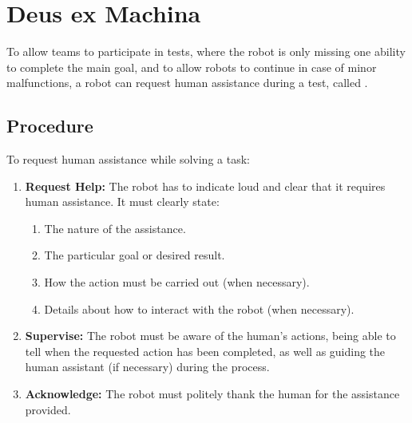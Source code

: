 \section{Deus ex Machina}
\label{sec:rules:deusexmachina}
To allow teams to participate in tests, where the robot is only missing one ability to complete the main goal, and to allow robots to continue in case of minor malfunctions, a robot can request human assistance during a test, called \DEM{}. 

\subsection{Procedure}
\label{sec:rules:demprocedure}
To request human assistance while solving a task:

\begin{enumerate}
	\item \textbf{Request Help:} The robot has to indicate loud and clear that it requires human assistance. It must clearly state:
	\begin{enumerate}
		\item The nature of the assistance.
		\item The particular goal or desired result.
		\item How the action must be carried out (when necessary).
		\item Details about how to interact with the robot (when necessary).
	\end{enumerate}

	\item \textbf{Supervise:} The robot must be aware of the human's actions, being able to tell when the requested action has been completed, as well as guiding the human assistant (if necessary) during the process.

	\item \textbf{Acknowledge:} The robot must politely thank the human for the assistance provided.
\end{enumerate}


